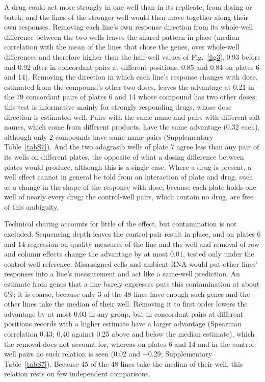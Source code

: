 \documentclass[pdflatex,sn-nature]{sn-jnl}
\begin{document}
A drug could act more strongly in one well than in its replicate, from dosing or batch, and the lines of the stronger well would then move together along their own responses. Removing each line's own response direction from its whole-well difference between the two wells leaves the shared pattern in place (median correlation with the mean of the lines that chose the genes, over whole-well differences and therefore higher than the half-well values of Fig.~\ref{fig3}, 0.93 before and 0.92 after in concordant pairs at different positions, 0.85 and 0.84 on plates 6 and 14). Removing the direction in which each line's response changes with dose, estimated from the compound's other two doses, leaves the advantage at 0.21 in the 79 concordant pairs of plates 6 and 14 whose compound has two other doses; this test is informative mainly for strongly responding drugs, whose dose direction is estimated well. Pairs with the same name and pairs with different salt names, which come from different products, have the same advantage (0.32 each), although only 2 compounds have same-name pairs (Supplementary Table~\ref{tabS7}). And the two adagrasib wells of plate 7 agree less than any pair of its wells on different plates, the opposite of what a dosing difference between plates would produce, although this is a single case. Where a drug is present, a well effect cannot in general be told from an interaction of plate and drug, such as a change in the shape of the response with dose, because each plate holds one well of nearly every drug; the control-well pairs, which contain no drug, are free of this ambiguity.

Technical sharing accounts for little of the effect, but contamination is not excluded. Sequencing depth leaves the control-pair result in place, and on plates 6 and 14 regression on quality measures of the line and the well and removal of row and column effects change the advantage by at most 0.01, tested only under the control-well reference. Misassigned cells and ambient RNA would put other lines' responses into a line's measurement and act like a same-well prediction. An estimate from genes that a line barely expresses puts this contamination at about 6\%; it is coarse, because only 3 of the 48 lines have enough such genes and the other lines take the median of their well. Removing it to first order lowers the advantage by at most 0.03 in any group, but in concordant pairs at different positions records with a higher estimate have a larger advantage (Spearman correlation 0.43; 0.40 against 0.25 above and below the median estimate), which the removal does not account for, whereas on plates 6 and 14 and in the control-well pairs no such relation is seen (0.02 and $-0.29$; Supplementary Table~\ref{tabS7}). Because 45 of the 48 lines take the median of their well, this relation rests on few independent comparisons.
\end{document}
